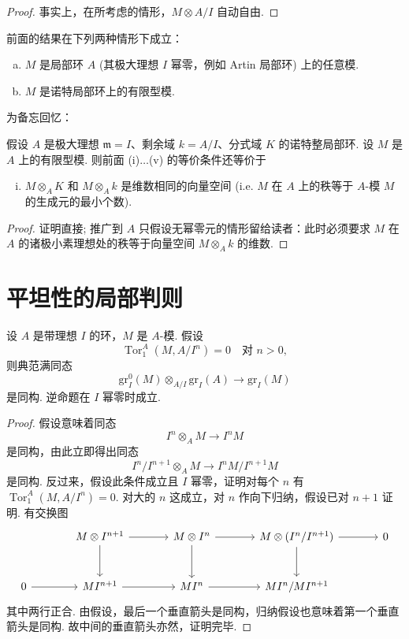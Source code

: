 \begin{proof}
事实上，在所考虑的情形，$M \otimes A/I$ 自动自由.
\end{proof}

前面的结果在下列两种情形下成立：
\begin{enumerate}[a)]
\item $M$ 是局部环 $A$ (其极大理想 $I$ 幂零，例如 Artin 局部环) 上的任意模.
\item $M$ 是诺特局部环上的有限型模.
\end{enumerate}

为备忘回忆：

\begin{corollary}\label{cor:IV.4.4}
假设 $A$ 是极大理想 $\mathfrak{m} = I$、剩余域 $k = A/I$、分式域 $K$ 的诺特整局部环. 设 $M$ 是 $A$ 上的有限型模. 则前面 (i)$\dots$(v) 的等价条件还等价于
\begin{enumerate}[(i)]
\item[((vi))] $M \otimes_A K$ 和 $M \otimes_A k$ 是维数相同的向量空间 (i.e. $M$ 在 $A$ 上的秩等于 $A$-模 $M$ 的生成元的最小个数).
\end{enumerate}
\end{corollary}

\begin{proof}
证明直接; 推广到 $A$ 只假设无幂零元的情形留给读者：此时必须要求 $M$ 在 $A$ 的诸极小素理想处的秩等于向量空间 $M \otimes_A k$ 的维数.
\end{proof}

\section{平坦性的局部判则}

\begin{proposition}\label{prop:IV.5.1}
设 $A$ 是带理想 $I$ 的环，$M$ 是 $A$-模. 假设
\[
\operatorname{Tor}_{1}^{A}(M, A/I^n) = 0 \quad \text{对 } n > 0,
\]
则典范满同态
\begin{equation}
\mathrm{gr}_{I}^{0}(M) \otimes_{A/I} \mathrm{gr}_{I}(A) \longrightarrow \mathrm{gr}_{I}(M) \tag{($*$)}
\end{equation}
是同构. 逆命题在 $I$ 幂零时成立.
\end{proposition}

\begin{proof}
假设意味着同态
\[
I^n \otimes_A M \longrightarrow I^n M
\]
是同构，由此立即得出同态
\[
I^n/I^{n+1} \otimes_A M \longrightarrow I^n M/I^{n+1} M
\]
是同构. 反过来，假设此条件成立且 $I$ 幂零，证明对每个 $n$ 有 $\operatorname{Tor}_{1}^{A}(M, A/I^n) = 0$. 对大的 $n$ 这成立，对 $n$ 作向下归纳，假设已对 $n+1$ 证明. 有交换图
\[
\begin{tikzcd}[row sep=large, column sep=large]
& M \otimes I^{n+1} \arrow[r] \arrow[d] & M \otimes I^n \arrow[r] \arrow[d] & M \otimes (I^n/I^{n+1}) \arrow[r] \arrow[d] & 0 \\
0 \arrow[r] & MI^{n+1} \arrow[r] & MI^n \arrow[r] & MI^n/MI^{n+1}
\end{tikzcd}
\]
其中两行正合. 由假设，最后一个垂直箭头是同构，归纳假设也意味着第一个垂直箭头是同构. 故中间的垂直箭头亦然，证明完毕.
\end{proof}

